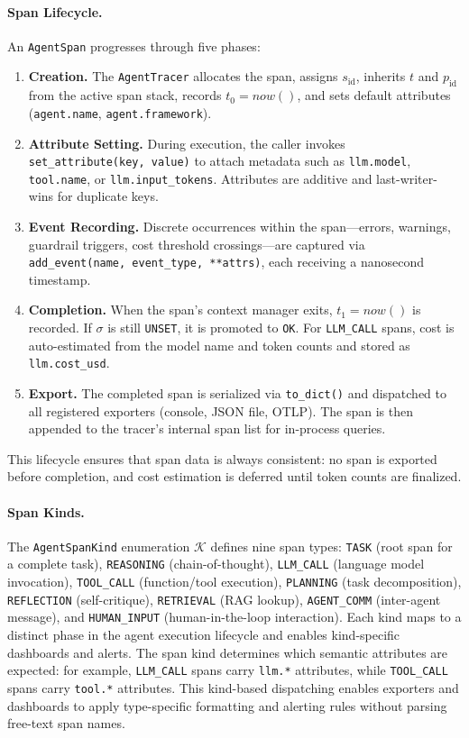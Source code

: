 \documentclass[sigconf,nonacm]{acmart}
\begin{document}
\paragraph{Span Lifecycle.}
An \texttt{AgentSpan} progresses through five phases:
\begin{enumerate}[leftmargin=*,nosep]
    \item \textbf{Creation.}  The \texttt{AgentTracer} allocates the span, assigns $s_{\mathrm{id}}$, inherits $t$ and $p_{\mathrm{id}}$ from the active span stack, records $t_0 = \mathit{now}()$, and sets default attributes (\texttt{agent.name}, \texttt{agent.framework}).
    \item \textbf{Attribute Setting.}  During execution, the caller invokes \texttt{set\_attribute(key, value)} to attach metadata such as \texttt{llm.model}, \texttt{tool.name}, or \texttt{llm.input\_tokens}.  Attributes are additive and last-writer-wins for duplicate keys.
    \item \textbf{Event Recording.}  Discrete occurrences within the span---errors, warnings, guardrail triggers, cost threshold crossings---are captured via \texttt{add\_event(name, event\_type, **attrs)}, each receiving a nanosecond timestamp.
    \item \textbf{Completion.}  When the span's context manager exits, $t_1 = \mathit{now}()$ is recorded.  If $\sigma$ is still \texttt{UNSET}, it is promoted to \texttt{OK}.  For \texttt{LLM\_CALL} spans, cost is auto-estimated from the model name and token counts and stored as \texttt{llm.cost\_usd}.
    \item \textbf{Export.}  The completed span is serialized via \texttt{to\_dict()} and dispatched to all registered exporters (console, JSON file, OTLP).  The span is then appended to the tracer's internal span list for in-process queries.
\end{enumerate}
This lifecycle ensures that span data is always consistent: no span is exported before completion, and cost estimation is deferred until token counts are finalized.

\paragraph{Span Kinds.}
The \texttt{AgentSpanKind} enumeration $\mathcal{K}$ defines nine span types:
\texttt{TASK} (root span for a complete task), \texttt{REASONING} (chain-of-thought),
\texttt{LLM\_CALL} (language model invocation), \texttt{TOOL\_CALL}
(function/tool execution), \texttt{PLANNING} (task decomposition),
\texttt{REFLECTION} (self-critique), \texttt{RETRIEVAL} (RAG lookup),
\texttt{AGENT\_COMM} (inter-agent message), and \texttt{HUMAN\_INPUT}
(human-in-the-loop interaction).  Each kind maps to a distinct phase in
the agent execution lifecycle and enables kind-specific dashboards and
alerts.  The span kind determines which semantic attributes are expected:
for example, \texttt{LLM\_CALL} spans carry \texttt{llm.*} attributes,
while \texttt{TOOL\_CALL} spans carry \texttt{tool.*} attributes.  This
kind-based dispatching enables exporters and dashboards to apply
type-specific formatting and alerting rules without parsing free-text
span names.
\end{document}
